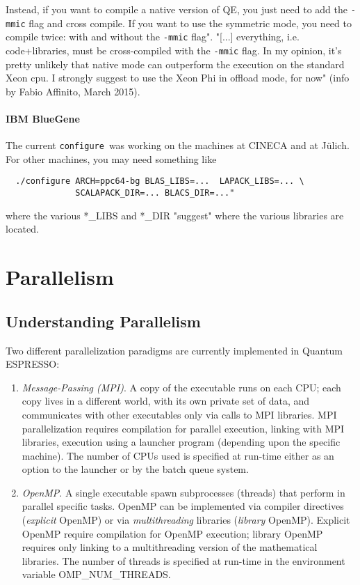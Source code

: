 \documentclass[12pt,a4paper]{article}
\def\qe{{\sc Quantum ESPRESSO}}
\def\configure{\texttt{configure}}
\begin{document}
Instead, if you want to compile a native version of QE, you just need
to add the \texttt{-mmic} flag and cross compile. If you want to use
the symmetric mode, you need to compile twice: with and without the
\texttt{-mmic} flag". "[...] everything, i.e. code+libraries, must be
cross-compiled with the \texttt{-mmic} flag. In my opinion, it's pretty
unlikely that native mode can outperform the execution on the standard
Xeon cpu. I strongly suggest to use the Xeon Phi in offload mode, for now"
(info by Fabio Affinito, March 2015).

\paragraph{IBM BlueGene}

The current \configure\ was working on the machines at CINECA and at J\"ulich.
For other machines, you may need something like
\begin{verbatim}
  ./configure ARCH=ppc64-bg BLAS_LIBS=...  LAPACK_LIBS=... \
              SCALAPACK_DIR=... BLACS_DIR=..."
\end{verbatim}
where the various *\_LIBS and *\_DIR "suggest" where the various libraries
are located.

\newpage

\section{Parallelism}
\label{Sec:para}

\subsection{Understanding Parallelism}

Two different parallelization paradigms are currently implemented
in \qe:
\begin{enumerate}
\item {\em Message-Passing (MPI)}. A copy of the executable runs
on each CPU; each copy lives in a different world, with its own
private set of data, and communicates with other executables only
via calls to MPI libraries. MPI parallelization requires compilation
for parallel execution, linking with MPI libraries, execution using
a launcher program (depending upon the specific machine). The number
of CPUs used
is specified at run-time either as an option to the launcher or
by the batch queue system.
\item {\em OpenMP}.  A single executable spawn subprocesses
(threads) that perform in parallel specific tasks.
OpenMP can be implemented via compiler directives ({\em explicit}
OpenMP) or via {\em multithreading} libraries  ({\em library} OpenMP).
Explicit OpenMP require compilation for OpenMP execution;
library OpenMP requires only linking to a multithreading
version of the mathematical libraries.
The number of threads is specified at run-time in the environment
variable OMP\_NUM\_THREADS.
\end{enumerate}
\end{document}
